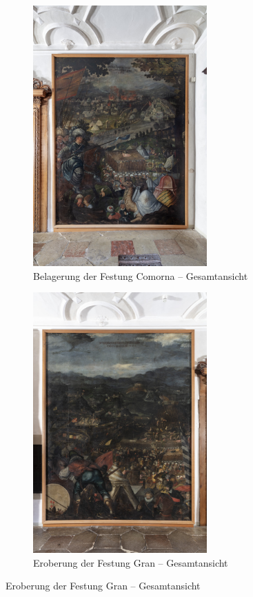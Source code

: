 \documentclass[
  a4paper,
]{book}
\begin{document}
\begin{figure}
\begin{figure}[H]    
  \includegraphics[height=10cm]{images/fmd10005850a.jpg}
  \caption{Belagerung der Festung Comorna – Gesamtansicht}
  \label{fig:{images/fmd10005850a.jpg}}
\end{figure}

\clearpage

\begin{figure}[H]    
  \includegraphics[height=10cm]{images/fmd10005848a.jpg}
  \caption{Eroberung der Festung Gran – Gesamtansicht}
  \label{fig:{images/fmd10005848a.jpg}}
\end{figure}

\clearpage


\end{figure}
\end{document}
